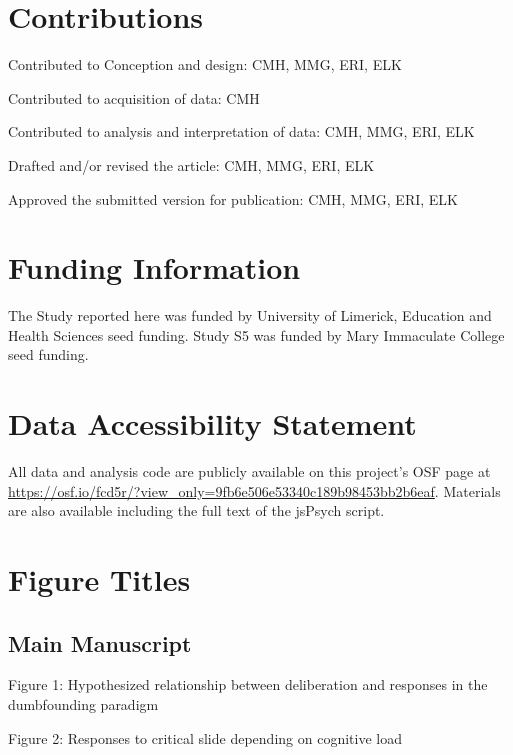 \documentclass[
]{article}
\author{}
\date{\vspace{-2.5em}}
\begin{document}
\hypertarget{contributions}{%
\section{Contributions}\label{contributions}}

Contributed to Conception and design: CMH, MMG, ERI, ELK

Contributed to acquisition of data: CMH

Contributed to analysis and interpretation of data: CMH, MMG, ERI, ELK

Drafted and/or revised the article: CMH, MMG, ERI, ELK

Approved the submitted version for publication: CMH, MMG, ERI, ELK

\hypertarget{funding-information}{%
\section{Funding Information}\label{funding-information}}

The Study reported here was funded by University of Limerick, Education
and Health Sciences seed funding. Study S5 was funded by Mary Immaculate
College seed funding.

\hypertarget{data-accessibility-statement}{%
\section{Data Accessibility
Statement}\label{data-accessibility-statement}}

All data and analysis code are publicly available on this project's OSF
page at
\url{https://osf.io/fcd5r/?view_only=9fb6e506e53340c189b98453bb2b6eaf}.
Materials are also available including the full text of the jsPsych
script.

\hypertarget{figure-titles}{%
\section{Figure Titles}\label{figure-titles}}

\hypertarget{main-manuscript}{%
\subsection{Main Manuscript}\label{main-manuscript}}

Figure 1: Hypothesized relationship between deliberation and responses
in the dumbfounding paradigm

Figure 2: Responses to critical slide depending on cognitive load
\end{document}
